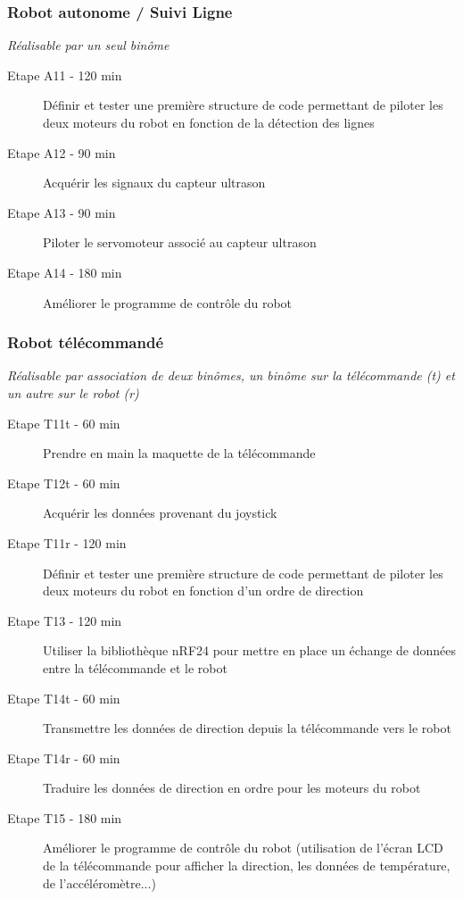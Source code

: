\documentclass[a4paper,11pt,titlepage]{article} %
\begin{document}
\subsubsection{Robot autonome / Suivi Ligne}

 \textit{Réalisable par un seul binôme}

\begin{description}
	\item[Etape A11 - 120 min] Définir et tester une première structure de code permettant de piloter les deux moteurs du robot en fonction de la détection des lignes
	\item[Etape A12 - 90 min] Acquérir les signaux du capteur ultrason
	\item[Etape A13 - 90 min] Piloter le servomoteur associé au capteur ultrason
	\item[Etape A14 - 180 min] Améliorer le programme de contrôle du robot
\end{description}
	

\subsubsection{Robot télécommandé}

 \textit{Réalisable par association de deux binômes, un binôme sur la télécommande (t) et un autre sur le robot (r)}


\begin{description}
	\item[Etape T11t - 60 min] Prendre en main la maquette de la télécommande
	\item[Etape T12t - 60 min] Acquérir les données provenant du joystick
	\item[Etape T11r - 120 min] Définir et tester une première structure de code permettant de piloter les deux moteurs du robot en fonction d'un ordre de direction
	\item[Etape T13 - 120 min] Utiliser la bibliothèque nRF24 pour mettre en place un échange de données entre la télécommande et le robot
	\item[Etape T14t - 60 min] Transmettre les données de direction depuis la télécommande vers le robot
	\item[Etape T14r - 60 min] Traduire les données de direction en ordre pour les moteurs du robot
	\item[Etape T15 - 180 min] Améliorer le programme de contrôle du robot (utilisation de l'écran LCD de la télécommande pour afficher la direction, les données de température, de l'accéléromètre...)		
\end{description}
\end{document}

